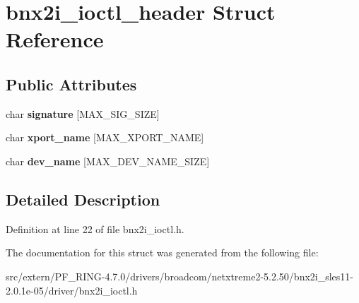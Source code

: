 \hypertarget{structbnx2i__ioctl__header}{
\section{bnx2i\_\-ioctl\_\-header Struct Reference}
\label{structbnx2i__ioctl__header}
}
\subsection*{Public Attributes}
\begin{DoxyCompactItemize}
\item 
\hypertarget{structbnx2i__ioctl__header_a11984fda8b9f3c0421ed484a33793c41}{
char {\bfseries signature} \mbox{[}MAX\_\-SIG\_\-SIZE\mbox{]}}
\label{structbnx2i__ioctl__header_a11984fda8b9f3c0421ed484a33793c41}

\item 
\hypertarget{structbnx2i__ioctl__header_ab7c9a94ead80049b0a84e5836f4a4b81}{
char {\bfseries xport\_\-name} \mbox{[}MAX\_\-XPORT\_\-NAME\mbox{]}}
\label{structbnx2i__ioctl__header_ab7c9a94ead80049b0a84e5836f4a4b81}

\item 
\hypertarget{structbnx2i__ioctl__header_af4aac4e7c0f3c60224060bf63d3b16cf}{
char {\bfseries dev\_\-name} \mbox{[}MAX\_\-DEV\_\-NAME\_\-SIZE\mbox{]}}
\label{structbnx2i__ioctl__header_af4aac4e7c0f3c60224060bf63d3b16cf}

\end{DoxyCompactItemize}


\subsection{Detailed Description}


Definition at line 22 of file bnx2i\_\-ioctl.h.



The documentation for this struct was generated from the following file:\begin{DoxyCompactItemize}
\item 
src/extern/PF\_\-RING-\/4.7.0/drivers/broadcom/netxtreme2-\/5.2.50/bnx2i\_\-sles11-\/2.0.1e-\/05/driver/bnx2i\_\-ioctl.h\end{DoxyCompactItemize}
